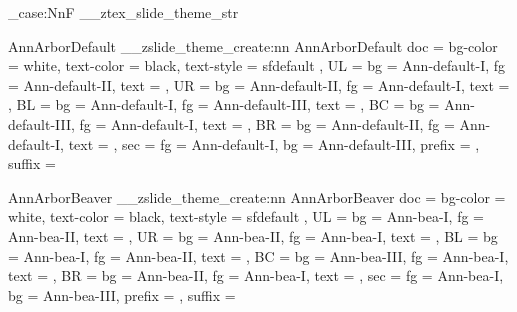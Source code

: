 \str_case:NnF \g__ztex_slide_theme_str {
  {AnnArborDefault}{
    \__zslide_theme_create:nn {AnnArborDefault}{
      doc = {
        bg-color = white,
        text-color = black,
        text-style = sfdefault
      },
      UL = {
        bg   = Ann-default-I,
        fg   = Ann-default-II,
        text = {\zslideUL}
      },
      UR = {
        bg   = Ann-default-II,
        fg   = Ann-default-I,
        text = {\zslideUR}
      },
      BL = {
        bg   = Ann-default-I,
        fg   = Ann-default-III,
        text = \zslideauthor
      },
      BC = {
        bg   = Ann-default-III,
        fg   = Ann-default-I,
        text = \zslidetitle
      },
      BR = {
        bg   = Ann-default-II,
        fg   = Ann-default-I,
        text = \zslideBR
      },
      sec = {
        fg   = Ann-default-I,
        bg   = Ann-default-III,
        prefix = {},
        suffix = {}
      }
    }
  }

  {AnnArborBeaver}{
    \__zslide_theme_create:nn {AnnArborBeaver}{ 
      doc = {
        bg-color = white,
        text-color = black,
        text-style = sfdefault
      },
      UL = {
        bg   = Ann-bea-I,
        fg   = Ann-bea-II, 
        text = {\zslideUL} 
      },
      UR = {
        bg   = Ann-bea-II,
        fg   = Ann-bea-I,
        text = {\zslideUR}
      },
      BL = {
        bg   = Ann-bea-I,
        fg   = Ann-bea-II,
        text = \zslideauthor
      },
      BC = {
        bg   = Ann-bea-III,
        fg   = Ann-bea-I,
        text = \zslidetitle
      },
      BR = {
        bg   = Ann-bea-II,
        fg   = Ann-bea-I,
        text = \zslideBR 
      },
      sec = {
        fg   = Ann-bea-I,
        bg   = Ann-bea-III,
        prefix = {},
        suffix = {}
      }
    }
  }

}
